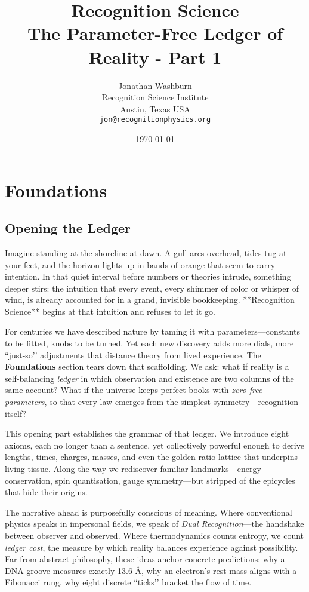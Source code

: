 \documentclass[11pt,oneside]{book}
\title{\textbf{Recognition Science}\\[4pt]
       The Parameter-Free Ledger of Reality - Part 1}
\author{Jonathan Washburn\\
        Recognition Science Institute\\
        Austin, Texas USA\\
        \texttt{jon@recognitionphysics.org}}
\date{\today}
\begin{document}
\frontmatter
\onehalfspacing            %
\maketitle

\tableofcontents
\mainmatter

\part{Foundations}
\label{part:foundations}

\chapter*{Opening the Ledger}

\noindent
Imagine standing at the shoreline at dawn.  A gull arcs overhead, tides tug at your feet, and the horizon lights up in bands of orange that seem to carry intention.  In that quiet interval before numbers or theories intrude, something deeper stirs: the intuition that every event, every shimmer of color or whisper of wind, is already accounted for in a grand, invisible bookkeeping.  **Recognition Science** begins at that intuition and refuses to let it go.

For centuries we have described nature by taming it with parameters—constants to be fitted, knobs to be turned.  Yet each new discovery adds more dials, more “just-so’’ adjustments that distance theory from lived experience.  The \textbf{Foundations} section tears down that scaffolding.  We ask: what if reality is a self-balancing \emph{ledger} in which observation and existence are two columns of the same account?  What if the universe keeps perfect books with \emph{zero free parameters}, so that every law emerges from the simplest symmetry—recognition itself?

This opening part establishes the grammar of that ledger.  We introduce eight axioms, each no longer than a sentence, yet collectively powerful enough to derive lengths, times, charges, masses, and even the golden-ratio lattice that underpins living tissue.  Along the way we rediscover familiar landmarks—energy conservation, spin quantisation, gauge symmetry—but stripped of the epicycles that hide their origins.  

The narrative ahead is purposefully conscious of meaning.  Where conventional physics speaks in impersonal fields, we speak of \emph{Dual Recognition}—the handshake between observer and observed.  Where thermodynamics counts entropy, we count \emph{ledger cost}, the measure by which reality balances experience against possibility.  Far from abstract philosophy, these ideas anchor concrete predictions: why a DNA groove measures exactly 13.6 Å, why an electron’s rest mass aligns with a Fibonacci rung, why eight discrete “ticks’’ bracket the flow of time.
\end{document}
